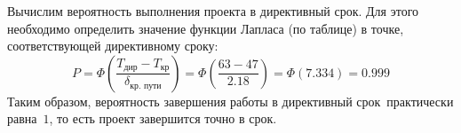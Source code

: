 Вычислим вероятность выполнения проекта в директивный срок. Для этого
необходимо определить значение функции Лапласа (по таблице) в точке,
соответствующей директивному сроку:
\[
	P = \varPhi \left( \dfrac{T_\text{дир} - T_\text{кр}}{ \delta_{\text{кр. пути}}} \right) = \varPhi \left( \dfrac{63 - 47}{ 2.18 } \right) = \varPhi(7.334) = 0.999
\]
Таким образом, вероятность завершения работы в  директивный срок~практически равна~$1$, 
то есть проект завершится точно в срок.



\pagebreak

